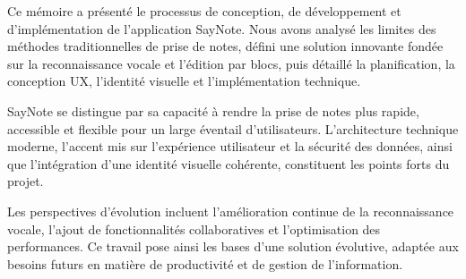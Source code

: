 
Ce mémoire a présenté le processus de conception, de développement et d’implémentation de l’application SayNote. Nous avons analysé les limites des méthodes traditionnelles de prise de notes, défini une solution innovante fondée sur la reconnaissance vocale et l’édition par blocs, puis détaillé la planification, la conception UX, l’identité visuelle et l’implémentation technique.

SayNote se distingue par sa capacité à rendre la prise de notes plus rapide, accessible et flexible pour un large éventail d’utilisateurs. L’architecture technique moderne, l’accent mis sur l’expérience utilisateur et la sécurité des données, ainsi que l’intégration d’une identité visuelle cohérente, constituent les points forts du projet.

Les perspectives d’évolution incluent l’amélioration continue de la reconnaissance vocale, l’ajout de fonctionnalités collaboratives et l’optimisation des performances. Ce travail pose ainsi les bases d’une solution évolutive, adaptée aux besoins futurs en matière de productivité et de gestion de l’information.
